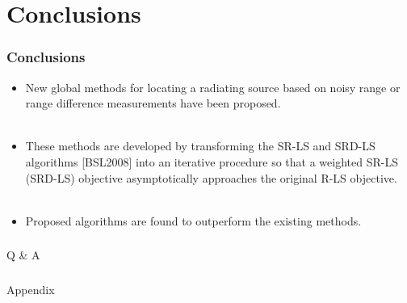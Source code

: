\section{Conclusions}

\begin{frame}
\frametitle{Conclusions}
\phantom{m}
\phantom{m}
\begin{itemize}
\item <2->
New global methods for locating a radiating source based on noisy range or range difference measurements have been proposed. \\~\\
\item <3->
These methods are developed by transforming the SR-LS and SRD-LS algorithms [BSL2008] into an iterative procedure %
so that a weighted SR-LS (SRD-LS) objective asymptotically approaches the original R-LS objective. \\~\\
\item <4->
Proposed algorithms are found to outperform the existing methods.
\end{itemize}
\end{frame}


\begin{frame} [noframenumbering]
\frametitle{  }
\phantom{m} 
\phantom{m}
\phantom{m} 
\phantom{m}
\phantom{m} 
\phantom{m}
\Huge{\centerline{Q \& A }}

\end{frame}

%
\appendix
\begin{frame} [noframenumbering]
\frametitle{  }
\phantom{m} 
\phantom{m}
\phantom{m} 
\phantom{m}
\phantom{m} 
\phantom{m}
\Huge{\centerline{Appendix}}
\end{frame}

